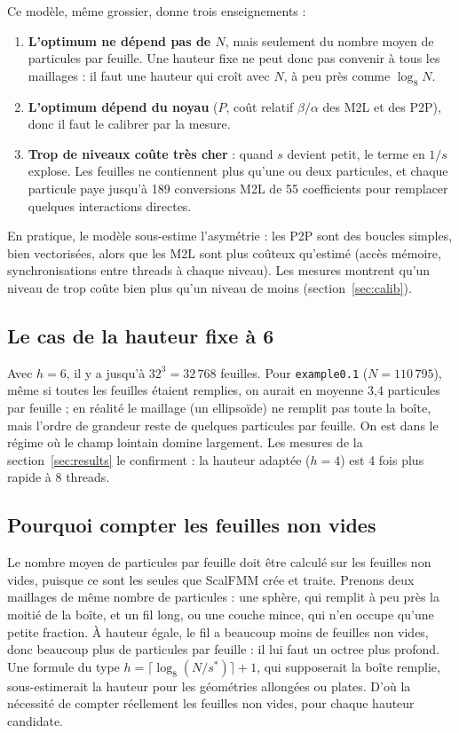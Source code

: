 \documentclass[11pt,a4paper]{article}
\newcommand{\code}[1]{\texttt{#1}}
\begin{document}
Ce modèle, même grossier, donne trois enseignements :
\begin{enumerate}
  \item \textbf{L'optimum ne dépend pas de $N$}, mais seulement du nombre moyen de particules par
        feuille. Une hauteur fixe ne peut donc pas convenir à tous les maillages : il faut une
        hauteur qui croît avec $N$, à peu près comme $\log_8 N$.
  \item \textbf{L'optimum dépend du noyau} ($P$, coût relatif $\beta/\alpha$ des M2L et des
        P2P), donc il faut le calibrer par la mesure.
  \item \textbf{Trop de niveaux coûte très cher} : quand $s$ devient petit, le terme en $1/s$
        explose. Les feuilles ne contiennent plus qu'une ou deux particules, et chaque
        particule paye jusqu'à 189 conversions M2L de 55 coefficients pour remplacer quelques
        interactions directes.
\end{enumerate}
En pratique, le modèle sous-estime l'asymétrie : les P2P sont des boucles simples, bien
vectorisées, alors que les M2L sont plus coûteux qu'estimé (accès mémoire, synchronisations entre
threads à chaque niveau). Les mesures montrent qu'un niveau de trop coûte bien plus qu'un niveau
de moins (section~\ref{sec:calib}).

\subsection{Le cas de la hauteur fixe à 6}

Avec $h = 6$, il y a jusqu'à $32^3 = 32\,768$ feuilles. Pour \code{example0.1}
($N = 110\,795$), même si toutes les feuilles étaient remplies, on aurait en moyenne 3,4
particules par feuille ; en réalité le maillage (un ellipsoïde) ne remplit pas toute la boîte, mais
l'ordre de grandeur reste de quelques particules par feuille. On est dans le régime où le champ
lointain domine largement. Les mesures de la section~\ref{sec:results} le confirment : la hauteur
adaptée ($h = 4$) est 4 fois plus rapide à 8 threads.

\subsection{Pourquoi compter les feuilles non vides}

Le nombre moyen de particules par feuille doit être calculé sur les feuilles non vides, puisque
ce sont les seules que ScalFMM crée et traite. Prenons deux maillages de même nombre de
particules : une sphère, qui remplit à peu près la moitié de la boîte, et un fil long, ou une
couche mince, qui n'en occupe qu'une petite fraction. À hauteur égale, le fil a beaucoup moins de
feuilles non vides, donc beaucoup plus de particules par feuille : il lui faut un octree plus
profond. Une formule du type $h = \lceil \log_8 (N/s^\ast) \rceil + 1$, qui supposerait la boîte
remplie, sous-estimerait la hauteur pour les géométries allongées ou plates. D'où la nécessité de
compter réellement les feuilles non vides, pour chaque hauteur candidate.
\end{document}
